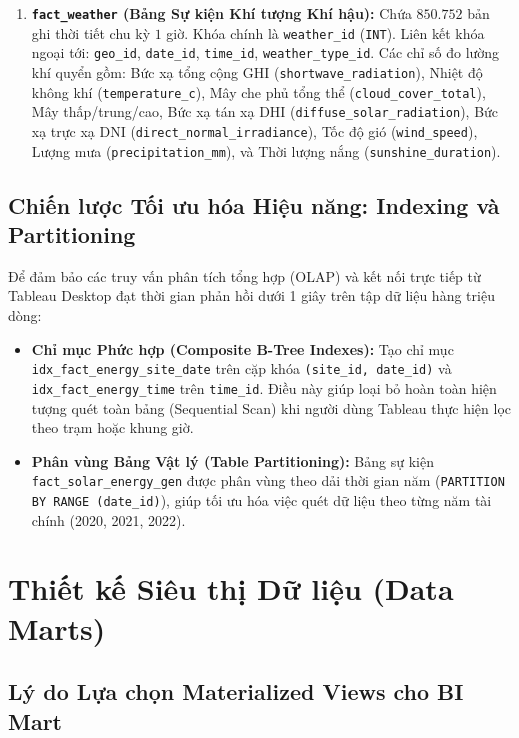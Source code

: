 \documentclass[12pt, a4paper]{report}
\begin{document}
\begin{enumerate}[label=\arabic*., leftmargin=*]
    \item \textbf{\texttt{fact\_weather} (Bảng Sự kiện Khí tượng Khí hậu):} Chứa $850.752$ bản ghi thời tiết chu kỳ $1$ giờ. Khóa chính là \texttt{weather\_id} (\texttt{INT}). Liên kết khóa ngoại tới: \texttt{geo\_id}, \texttt{date\_id}, \texttt{time\_id}, \texttt{weather\_type\_id}. Các chỉ số đo lường khí quyển gồm: Bức xạ tổng cộng GHI (\texttt{shortwave\_radiation}), Nhiệt độ không khí (\texttt{temperature\_c}), Mây che phủ tổng thể (\texttt{cloud\_cover\_total}), Mây thấp/trung/cao, Bức xạ tán xạ DHI (\texttt{diffuse\_solar\_radiation}), Bức xạ trực xạ DNI (\texttt{direct\_normal\_irradiance}), Tốc độ gió (\texttt{wind\_speed}), Lượng mưa (\texttt{precipitation\_mm}), và Thời lượng nắng (\texttt{sunshine\_duration}).
\end{enumerate}

\subsection{Chiến lược Tối ưu hóa Hiệu năng: Indexing và Partitioning}

Để đảm bảo các truy vấn phân tích tổng hợp (OLAP) và kết nối trực tiếp từ Tableau Desktop đạt thời gian phản hồi dưới 1 giây trên tập dữ liệu hàng triệu dòng:
\begin{itemize}[leftmargin=*]
    \item \textbf{Chỉ mục Phức hợp (Composite B-Tree Indexes):} Tạo chỉ mục \texttt{idx\_fact\_energy\_site\_date} trên cặp khóa \texttt{(site\_id, date\_id)} và \texttt{idx\_fact\_energy\_time} trên \texttt{time\_id}. Điều này giúp loại bỏ hoàn toàn hiện tượng quét toàn bảng (Sequential Scan) khi người dùng Tableau thực hiện lọc theo trạm hoặc khung giờ.
    \item \textbf{Phân vùng Bảng Vật lý (Table Partitioning):} Bảng sự kiện \texttt{fact\_solar\_energy\_gen} được phân vùng theo dải thời gian năm (\texttt{PARTITION BY RANGE (date\_id)}), giúp tối ưu hóa việc quét dữ liệu theo từng năm tài chính (2020, 2021, 2022).
\end{itemize}

\section{Thiết kế Siêu thị Dữ liệu (Data Marts)}
\label{sec:data_marts_design}

\subsection{Lý do Lựa chọn Materialized Views cho BI Mart}
\end{document}
